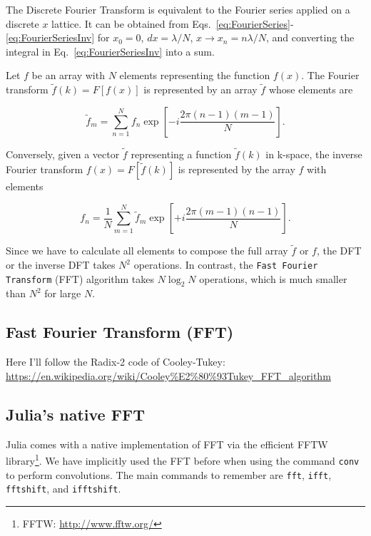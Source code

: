 The Discrete Fourier Transform is equivalent to the Fourier series applied on a discrete $x$ lattice. It can be obtained from Eqs.~\eqref{eq:FourierSeries}-\eqref{eq:FourierSeriesInv} for $x_0 = 0$, $dx = \lambda/N$, $x \rightarrow x_n = n\lambda/N$, and converting the integral in Eq.~\eqref{eq:FourierSeriesInv} into a sum.

Let $f$ be an array with $N$ elements representing the function $f(x)$. The Fourier transform $\tilde{f}(k) = F[f(x)]$ is represented by an array $\tilde{f}$ whose elements are

\begin{equation}
 \tilde{f}_m = \sum_{n=1}^N f_n \exp\left[-i \dfrac{2\pi(n-1)(m-1)}{N}\right].
\end{equation}

Conversely, given a vector $\tilde{f}$ representing a function $\tilde{f}(k)$ in k-space, the inverse Fourier transform $f(x) = F[\tilde{f}(k)]$ is represented by the array $f$ with elements

\begin{equation}
  f_n = \dfrac{1}{N} \sum_{m=1}^N \tilde{f}_m \exp\left[+i \dfrac{2\pi(m-1)(n-1)}{N}\right].
\end{equation}

Since we have to calculate all elements to compose the full array $\tilde{f}$ or $f$, the DFT or the inverse DFT takes $N^2$ operations. In contrast, the \texttt{Fast Fourier Transform} (FFT) algorithm takes $N\log_2 N$ operations, which is much smaller than $N^2$ for large $N$.

\subsection{Fast Fourier Transform (FFT)}

 Here I'll follow the Radix-2 code of Cooley-Tukey: \url{https://en.wikipedia.org/wiki/Cooley%E2%80%93Tukey_FFT_algorithm}


\subsection{Julia's native FFT}

Julia comes with a native implementation of FFT via the efficient FFTW library\footnote{FFTW: \url{http://www.fftw.org/}}. We have implicitly used the FFT before when using the command \texttt{conv} to perform convolutions. The main commands to remember are \texttt{fft}, \texttt{ifft}, \texttt{fftshift}, and \texttt{ifftshift}.

